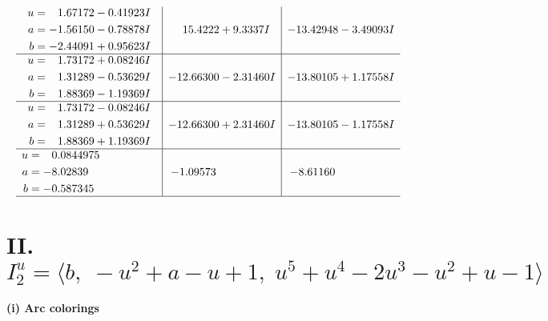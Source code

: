 \documentclass[1p]{elsarticle_modified}
\theoremstyle{definition}
\begin{document}
$$\begin{array}{c|c|c}
\begin{aligned}
u &= \phantom{-}1.67172 - 0.41923 I \\
a &= -1.56150 - 0.78878 I \\
b &= -2.44091 + 0.95623 I\end{aligned}
 & \phantom{-}15.4222 + 9.3337 I & -13.42948 - 3.49093 I \\ \hline\begin{aligned}
u &= \phantom{-}1.73172 + 0.08246 I \\
a &= \phantom{-}1.31289 - 0.53629 I \\
b &= \phantom{-}1.88369 - 1.19369 I\end{aligned}
 & -12.66300 - 2.31460 I & -13.80105 + 1.17558 I \\ \hline\begin{aligned}
u &= \phantom{-}1.73172 - 0.08246 I \\
a &= \phantom{-}1.31289 + 0.53629 I \\
b &= \phantom{-}1.88369 + 1.19369 I\end{aligned}
 & -12.66300 + 2.31460 I & -13.80105 - 1.17558 I \\ \hline\begin{aligned}
u &= \phantom{-}0.0844975\phantom{ +0.000000I} \\
a &= -8.02839\phantom{ +0.000000I} \\
b &= -0.587345\phantom{ +0.000000I}\end{aligned}
 & -1.09573\phantom{ +0.000000I} & -8.61160\phantom{ +0.000000I}\\
 \hline 
 \end{array}$$\newpage\newpage\renewcommand{\arraystretch}{1}
\centering \section*{II. $I^u_{2}= \langle b,\;- u^2+a- u+1,\;u^5+u^4-2 u^3- u^2+u-1 \rangle$}
\flushleft \textbf{(i) Arc colorings}\\
\end{document}
